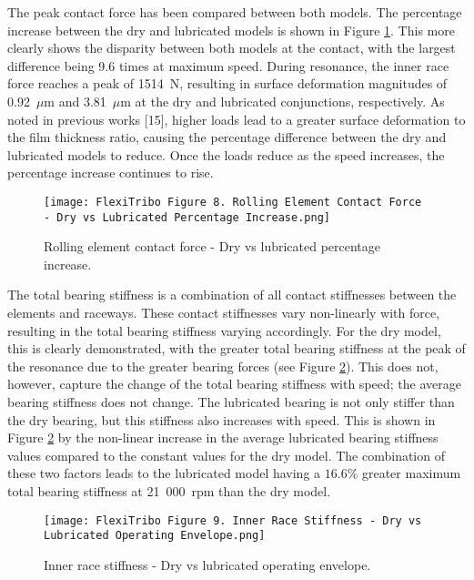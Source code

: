 The peak contact force has been compared between both models. The percentage increase between the dry and lubricated models is shown in Figure 	\ref{Rolling element contact force - Dry vs lubricated percentage increase}. This more clearly shows the disparity between both models at the contact, with the largest difference being 9.6 times at maximum speed. During resonance, the inner race force reaches a peak of 1514~$\mathrm{N}$, resulting in surface deformation magnitudes of 0.92~$\mu \mathrm{m}$ and 3.81~$\mu \mathrm{m}$ at the dry and lubricated conjunctions, respectively. As noted in previous works [15], higher loads lead to a greater surface deformation to the film thickness ratio, causing the percentage difference between the dry and lubricated models to reduce. Once the loads reduce as the speed increases, the percentage increase continues to rise.

\begin{figure}  
	\texttt{[image: FlexiTribo Figure 8. Rolling Element Contact Force - Dry vs Lubricated Percentage Increase.png]}
	\caption{Rolling element contact force - Dry vs lubricated percentage increase.}
	\label{Rolling element contact force - Dry vs lubricated percentage increase}
\end{figure} 

The total bearing stiffness is a combination of all contact stiffnesses between the elements and raceways. These contact stiffnesses vary non-linearly with force, resulting in the total bearing stiffness varying accordingly. For the dry model, this is clearly demonstrated, with the greater total bearing stiffness at the peak of the resonance due to the greater bearing forces (see Figure \ref{Inner race stiffness - Dry vs lubricated operating envelope}). This does not, however, capture the change of the total bearing stiffness with speed; the average bearing stiffness does not change. The lubricated bearing is not only stiffer than the dry bearing, but this stiffness also increases with speed. This is shown in Figure \ref{Inner race stiffness - Dry vs lubricated operating envelope} by the non-linear increase in the average lubricated bearing stiffness values compared to the constant values for the dry model. The combination of these two factors leads to the lubricated model having a $16.6 \%$ greater maximum total bearing stiffness at 21~000~$\mathrm{rpm}$ than the dry model.

\begin{figure}  
	\texttt{[image: FlexiTribo Figure 9. Inner Race Stiffness - Dry vs Lubricated Operating Envelope.png]}
	\caption{Inner race stiffness - Dry vs lubricated operating envelope.}
	\label{Inner race stiffness - Dry vs lubricated operating envelope}
\end{figure} 

